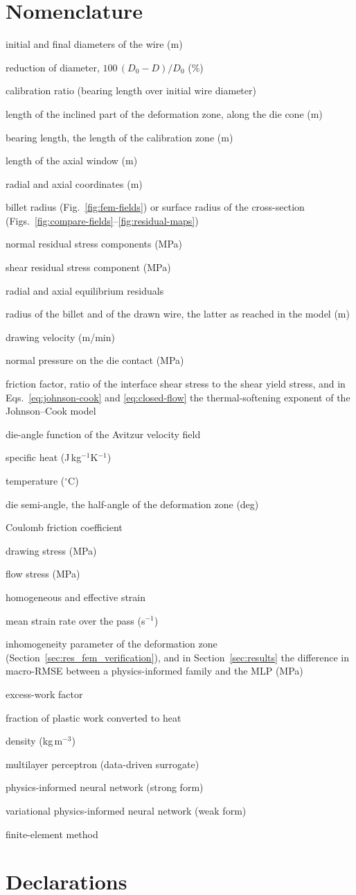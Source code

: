 \documentclass[pdflatex,sn-basic,Numbered]{sn-jnl}
\makeatletter
\newcommand{\edot}{\accentset{\scalebox{0.4}{$\bullet$}}{\varepsilon}}
\newlength{\nomenlabelwidth}
\newenvironment{nomenclature}[1][Nomenclature]{%
  \section*{#1}%
  \settowidth{\nomenlabelwidth}{$\sigma_{rr},\sigma_{\theta\theta},\sigma_{zz}$${}={}$}%
  \begin{list}{}{%
    \setlength{\topsep}{0pt}\setlength{\partopsep}{0pt}%
    \setlength{\itemsep}{0pt}\setlength{\parsep}{0pt}%
    \setlength{\labelsep}{0pt}\setlength{\labelwidth}{\nomenlabelwidth}%
    \setlength{\leftmargin}{\nomenlabelwidth}%
    \let\makelabel\@mklab}\raggedright}%
  {\end{list}}
\newcommand{\entry}[2]{\item[\hfill#1${}={}$]#2}
\newcommand{\EntryHeading}[1]{\itemsep8pt\goodbreak\item[\bfseries#1\hfill]\itemsep0pt\@itempenalty=1000\relax}
\makeatother
\begin{document}
\begin{nomenclature}
\entry{$D_0,D$}{initial and final diameters of the wire (m)}
\entry{$Q$}{reduction of diameter, $100\,(D_0-D)/D_0$ (\%)}
\entry{$k$}{calibration ratio (bearing length over initial wire diameter)}
\entry{$L$}{length of the inclined part of the deformation zone, along the die cone (m)}
\entry{$L_b$}{bearing length, the length of the calibration zone (m)}
\entry{$L_w$}{length of the axial window (m)}
\entry{$r,z$}{radial and axial coordinates (m)}
\entry{$R$}{billet radius (Fig.~\ref{fig:fem-fields}) or surface radius of the cross-section (Figs.~\ref{fig:compare-fields}--\ref{fig:residual-maps})}
\entry{$\sigma_{rr},\sigma_{\theta\theta},\sigma_{zz}$}{normal residual stress components (MPa)}
\entry{$\tau_{rz}$}{shear residual stress component (MPa)}
\entry{$R_r,R_z$}{radial and axial equilibrium residuals}
\entry{$R_0,R_f$}{radius of the billet and of the drawn wire, the latter as reached in the model (m)}
\entry{$v$}{drawing velocity (m/min)}
\entry{$p$}{normal pressure on the die contact (MPa)}
\entry{$m$}{friction factor, ratio of the interface shear stress to the shear yield stress, and in Eqs.~\eqref{eq:johnson-cook} and \eqref{eq:closed-flow} the thermal-softening exponent of the Johnson--Cook model}
\entry{$f(\alpha)$}{die-angle function of the Avitzur velocity field}
\entry{$c$}{specific heat (J\,kg$^{-1}$K$^{-1}$)}
\entry{$T$}{temperature ($^\circ$C)}
\EntryHeading{Greek Letters}
\entry{$\alpha$}{die semi-angle, the half-angle of the deformation zone (deg)}
\entry{$\mu$}{Coulomb friction coefficient}
\entry{$\sigma_d$}{drawing stress (MPa)}
\entry{$\sigma_f$}{flow stress (MPa)}
\entry{$\varepsilon_{\mathrm{hom}},\varepsilon_{\mathrm{eff}}$}{homogeneous and effective strain}
\entry{$\edot$}{mean strain rate over the pass (s$^{-1}$)}
\entry{$\Delta$}{inhomogeneity parameter of the deformation zone (Section~\ref{sec:res_fem_verification}), and in Section~\ref{sec:results} the difference in macro-RMSE between a physics-informed family and the MLP (MPa)}
\entry{$\Phi$}{excess-work factor}
\entry{$\beta$}{fraction of plastic work converted to heat}
\entry{$\rho$}{density (kg\,m$^{-3}$)}
\EntryHeading{Abbreviations}
\entry{MLP}{multilayer perceptron (data-driven surrogate)}
\entry{PINN}{physics-informed neural network (strong form)}
\entry{VPINN}{variational physics-informed neural network (weak form)}
\entry{FEM}{finite-element method}
\end{nomenclature}

\backmatter

\section*{Declarations}
\end{document}
